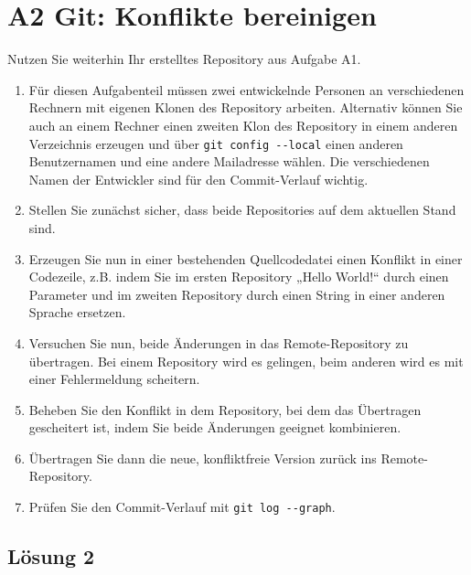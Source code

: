 \documentclass[main.tex]{subfiles}
\begin{document}
\section{A2 Git: Konflikte bereinigen}
Nutzen  Sie weiterhin Ihr erstelltes Repository aus Aufgabe A1.

\lstset{language=bash}

\lstset{style=MyCodeStyle}

\renewcommand{\labelenumi}{\arabic{enumi}.}

\begin{enumerate}
\item Für diesen Aufgabenteil müssen zwei entwickelnde Personen an verschiedenen Rechnern mit eigenen Klonen des Repository arbeiten. Alternativ können Sie auch an einem Rechner einen zweiten Klon des Repository in einem anderen Verzeichnis erzeugen und über
\lstinline|git config --local|
einen anderen Benutzernamen und eine andere Mailadresse wählen. Die verschiedenen Namen der Entwickler sind für den Commit-Verlauf wichtig.
\item Stellen Sie zunächst sicher, dass beide Repositories auf dem aktuellen Stand sind.
\item Erzeugen Sie nun in einer bestehenden Quellcodedatei einen Konflikt in einer Codezeile,
z.B. indem Sie im ersten Repository „Hello World!“ durch einen Parameter und im zweiten Repository durch einen String in einer anderen Sprache ersetzen.

\item Versuchen Sie nun, beide Änderungen in das Remote-Repository zu übertragen. Bei einem Repository wird es gelingen, beim anderen wird es mit einer Fehlermeldung scheitern.
\item Beheben Sie den Konflikt in dem Repository, bei dem das Übertragen gescheitert ist, indem Sie beide Änderungen geeignet kombinieren.
\item Übertragen Sie dann die neue, konfliktfreie Version zurück ins Remote-Repository.
\item Prüfen Sie den Commit-Verlauf mit \lstinline|git log --graph|.

\end{enumerate}

\subsection{Lösung 2}
\end{document}
